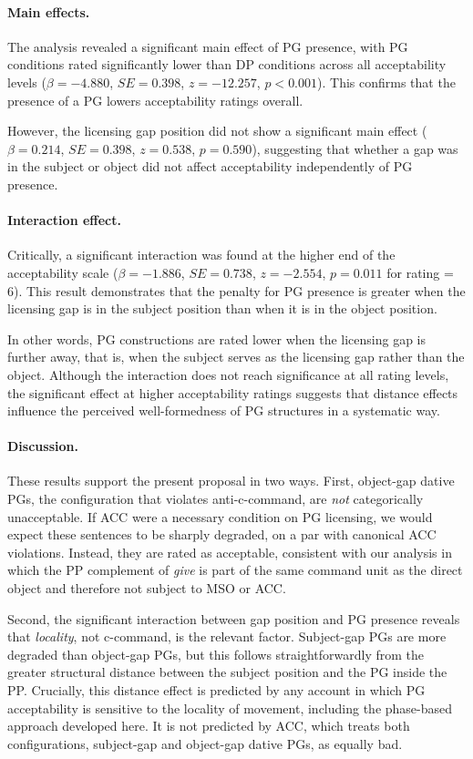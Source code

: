 \documentclass[12pt]{article}
\begin{document}
\paragraph{Main effects.} The analysis revealed a significant main effect of PG presence, with PG conditions rated significantly lower than DP conditions across all acceptability levels ($\beta = -4.880$, $SE = 0.398$, $z = -12.257$, $p < 0.001$). This confirms that the presence of a PG lowers acceptability ratings overall.

However, the licensing gap position did not show a significant main effect ($\beta = 0.214$, $SE = 0.398$, $z = 0.538$, $p = 0.590$), suggesting that whether a gap was in the subject or object did not affect acceptability independently of PG presence.

\paragraph{Interaction effect.} Critically, a significant interaction was found at the higher end of the acceptability scale ($\beta = -1.886$, $SE = 0.738$, $z = -2.554$, $p = 0.011$ for rating = 6). This result demonstrates that the penalty for PG presence is greater when the licensing gap is in the subject position than when it is in the object position.

In other words, PG constructions are rated lower when the licensing gap is further away, that is, when the subject serves as the licensing gap rather than the object. Although the interaction does not reach significance at all rating levels, the significant effect at higher acceptability ratings suggests that distance effects influence the perceived well-formedness of PG structures in a systematic way.

\paragraph{Discussion.} These results support the present proposal in two ways. First, object-gap dative PGs, the configuration that violates anti-c-command, are \textit{not} categorically unacceptable. If ACC were a necessary condition on PG licensing, we would expect these sentences to be sharply degraded, on a par with canonical ACC violations. Instead, they are rated as acceptable, consistent with our analysis in which the PP complement of \textit{give} is part of the same command unit as the direct object and therefore not subject to MSO or ACC.

Second, the significant interaction between gap position and PG presence reveals that \textit{locality}, not c-command, is the relevant factor. Subject-gap PGs are more degraded than object-gap PGs, but this follows straightforwardly from the greater structural distance between the subject position and the PG inside the PP. Crucially, this distance effect is predicted by any account in which PG acceptability is sensitive to the locality of movement, including the phase-based approach developed here. It is not predicted by ACC, which treats both configurations, subject-gap and object-gap dative PGs, as equally bad.
\end{document}
